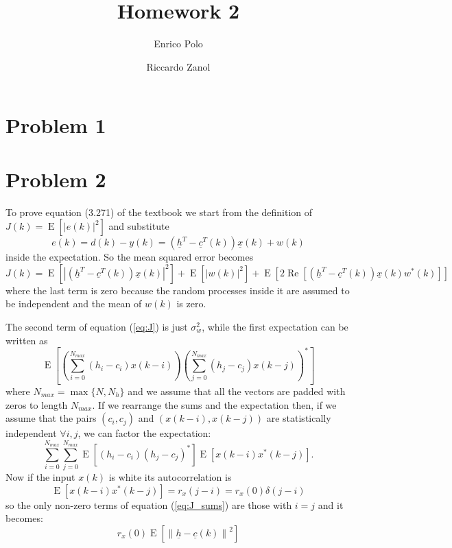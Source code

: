 \documentclass[a4paper,oneside]{article}
\author{Enrico Polo \and Riccardo Zanol}
\title{Homework 2}
\renewcommand{\vec}[1]{\underline{#1}}
\renewcommand{\Re}[1]{\operatorname{Re}\left[#1\right]}
\newcommand{\E}[1]{\operatorname{E}\left[#1\right]}
\newcommand{\norm}[1]{\left\lVert#1\right\rVert}
\newcommand{\abs}[1]{\left|#1\right|}
\begin{document}
\maketitle
\section*{Problem 1}
\section*{Problem 2}
To prove equation (3.271) of the textbook we start from the definition
of $J(k) = \E{\abs{e(k)}^2}$ and substitute
\[ e(k) = d(k) - y(k) = \left(\vec{h}^T - \vec{c}^T(k) \right) \vec{x}(k) + w(k) \]
inside the expectation. So the mean squared error becomes
\begin{equation}
  J(k) = \E{\abs{\left(\vec{h}^T - \vec{c}^T(k) \right) \vec{x}(k)}^2}
  + \E{\abs{w(k)}^2}
  + \E{2\Re{\left(\vec{h}^T - \vec{c}^T(k) \right) \vec{x}(k) w^*(k)}}
  \label{eq:J}
\end{equation}
where the last term is zero because the random processes inside it are
assumed to be independent and the mean of $w(k)$ is zero.

The second term of equation (\ref{eq:J}) is just $\sigma^2_w$, while
the first expectation can be written as
\[ \E{
  \left(\sum_{i=0}^{N_{max}}\left(h_i - c_i\right)x(k-i)\right)
  \left(\sum_{j=0}^{N_{max}}\left(h_j - c_j\right)x(k-j)\right)^* } \]
where $N_{max} = \max\{N, N_h\}$ and we assume that all the vectors
are padded with zeros to length $N_{max}$.  If we rearrange the sums
and the expectation then, if we assume that the pairs $(c_i,c_j)$ and
$(x(k-i),x(k-j))$ are statistically independent $\forall i,j$, we can
factor the expectation:
\begin{equation}
\sum_{i=0}^{N_{max}}\sum_{j=0}^{N_{max}}
\E{(h_i -c_i)(h_j-c_j)^*}
\E{x(k-i)x^*(k-j)} .
\label{eq:J_sums}
\end{equation}
Now if the input $x(k)$ is white its autocorrelation is
\[
\E{x(k-i)x^*(k-j)} = r_x(j-i) = r_x(0)\delta(j-i)
\]
so the only non-zero terms of equation (\ref{eq:J_sums}) are those
with $i=j$ and it becomes:
\begin{equation}
  r_x(0)\E{\norm{\vec{h}-\vec{c}(k)}^2}
  \label{eq:J_final_diff}
\end{equation}
\end{document}
